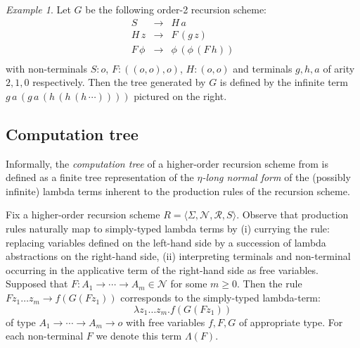 \documentclass[a4paper]{article}[12pt]
\theoremstyle{remark}
\newtheorem{example}{Example}[section]
\theoremstyle{definition}
\begin{document}
\begin{example}\label{eg:running}
	Let $G$ be the following order-2 recursion scheme:
	\[\begin{array}{rll}
	S & \rightarrow & H \, a\\
	H \, z & \rightarrow & F \, (g \,
	z)\\
	F \, \phi & \rightarrow & \phi \, (\phi \, (F \, h))\\
	\end{array}\]
	with non-terminals $S:o$, $F : ((o, o),o)$, $H:(o,o)$ and terminals $g, h, a$ of arity $2, 1, 0$ respectively.
	Then the tree generated by $G$ is defined by the infinite term
	$g \, a \, (g \, a \, (h \, (h \, (h \,
	\cdots))))$ pictured on the right.%
	
\end{example}

\subsection{Computation tree}

Informally, the \emph{computation tree} of a higher-order recursion scheme from \cite{OngLics2006} is defined as a finite tree representation of the \emph{$\eta$-long normal form} of the (possibly infinite) lambda terms inherent to the production rules of the recursion scheme.

Fix a higher-order recursion scheme $R = \langle \Sigma, \mathcal{N}, \mathcal{R}, S \rangle$.
Observe that production rules naturally map to simply-typed lambda terms by (i) currying the rule: replacing variables defined on the left-hand side by a succession of lambda abstractions on the right-hand side, (ii) interpreting terminals and non-terminal occurring in the applicative term of the right-hand side as free variables. Supposed that $F : A_1 \rightarrow \cdots \rightarrow A_m \in \mathcal{N}$ for some $m\geq 0$. Then the rule $F z_1 \ldots z_m \rightarrow f (G (F z_1))$ corresponds to the simply-typed lambda-term:
$$\lambda z_1 \ldots z_m . f (G (F z_1))$$ of type $A_1 \rightarrow \cdots \rightarrow A_m \rightarrow o$ with free variables $f, F, G$ of appropriate type. For each non-terminal $F$ we denote this term $\Lambda(F)$.
\end{document}
